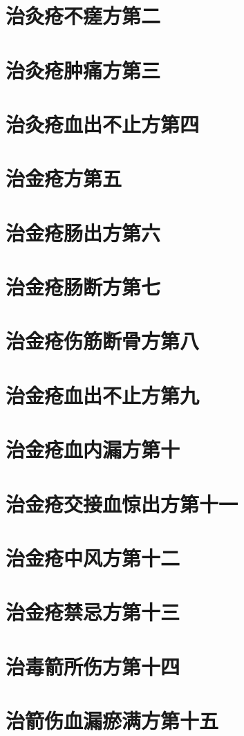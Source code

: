 \documentclass[a4paper,12pt,UTF8,twoside]{ctexbook}
\begin{document}
\chapter{治灸疮不瘥方第二}
\chapter{治灸疮肿痛方第三}
\chapter{治灸疮血出不止方第四}
\chapter{治金疮方第五}
\chapter{治金疮肠出方第六}
\chapter{治金疮肠断方第七}
\chapter{治金疮伤筋断骨方第八}
\chapter{治金疮血出不止方第九}
\chapter{治金疮血内漏方第十}
\chapter{治金疮交接血惊出方第十一}
\chapter{治金疮中风方第十二}
\chapter{治金疮禁忌方第十三}
\chapter{治毒箭所伤方第十四}
\chapter{治箭伤血漏瘀满方第十五}
\end{document}
